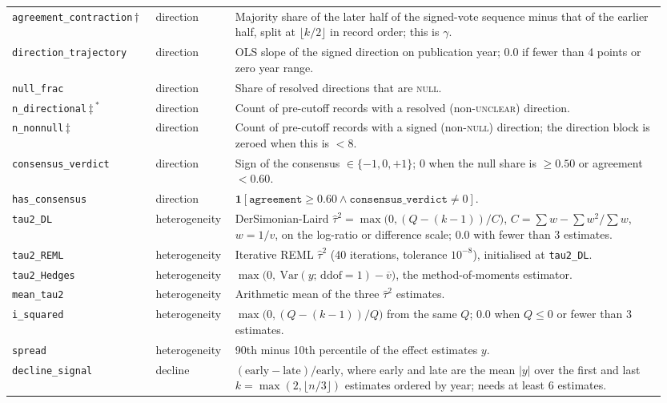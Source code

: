\documentclass[11pt]{article}
\begin{document}
\begin{longtable}{@{}p{0.215\linewidth}p{0.105\linewidth}p{0.63\linewidth}@{}}
\texttt{agreement\_contraction}\,$\dagger$ & direction & Majority share of the later half of the signed-vote sequence minus that of the earlier half, split at $\lfloor k/2\rfloor$ in record order; this is $\gamma$. \\
\texttt{direction\_trajectory} & direction & OLS slope of the signed direction on publication year; 0.0 if fewer than 4 points or zero year range. \\
\texttt{null\_frac} & direction & Share of resolved directions that are \textsc{null}. \\
\texttt{n\_directional}\,$\ddagger$\,$^{\ast}$ & direction & Count of pre-cutoff records with a resolved (non-\textsc{unclear}) direction. \\
\texttt{n\_nonnull}\,$\ddagger$ & direction & Count of pre-cutoff records with a signed (non-\textsc{null}) direction; the direction block is zeroed when this is $<8$. \\
\texttt{consensus\_verdict} & direction & Sign of the consensus $\in\{-1,0,+1\}$; 0 when the null share is $\ge0.50$ or agreement $<0.60$. \\
\texttt{has\_consensus} & direction & $\mathbf{1}[\texttt{agreement}\ge0.60 \wedge \texttt{consensus\_verdict}\neq0]$. \\
\texttt{tau2\_DL} & heterogeneity & DerSimonian-Laird $\hat\tau^2=\max\!\big(0,(Q-(k-1))/C\big)$, $C=\sum w-\sum w^2/\sum w$, $w=1/v$, on the log-ratio or difference scale; 0.0 with fewer than 3 estimates. \\
\texttt{tau2\_REML} & heterogeneity & Iterative REML $\hat\tau^2$ (40 iterations, tolerance $10^{-8}$), initialised at \texttt{tau2\_DL}. \\
\texttt{tau2\_Hedges} & heterogeneity & $\max\!\big(0,\ \mathrm{Var}(y;\,\mathrm{ddof}{=}1)-\overline{v}\big)$, the method-of-moments estimator. \\
\texttt{mean\_tau2} & heterogeneity & Arithmetic mean of the three $\hat\tau^2$ estimates. \\
\texttt{i\_squared} & heterogeneity & $\max\!\big(0,(Q-(k-1))/Q\big)$ from the same $Q$; 0.0 when $Q\le0$ or fewer than 3 estimates. \\
\texttt{spread} & heterogeneity & 90th minus 10th percentile of the effect estimates $y$. \\
\texttt{decline\_signal} & decline & $(\mathrm{early}-\mathrm{late})/\mathrm{early}$, where early and late are the mean $|y|$ over the first and last $k=\max(2,\lfloor n/3\rfloor)$ estimates ordered by year; needs at least 6 estimates. \\

\end{longtable}
\end{document}
